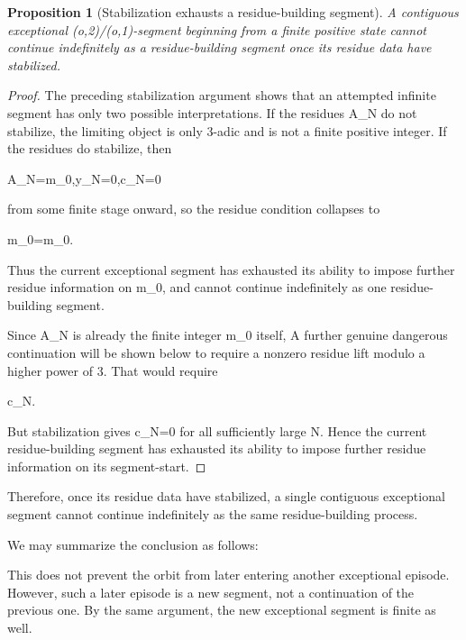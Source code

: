 \documentclass[11pt,letterpaper]{amsart}
\def\({}%
\def\){}%
\def\[{ }%
\def\]{ }%
\theoremstyle{definition}
\theoremstyle{plain}
\newtheorem{proposition}{Proposition}
\theoremstyle{plain}
\theoremstyle{remark}
\begin{document}
\begin{proposition}[Stabilization exhausts a residue-building segment]
\label{prop:stabilization-exhausts-residue-building-segment}
A contiguous exceptional \((o,2)/(o,1)\)-segment beginning from a finite
positive state cannot continue indefinitely as a residue-building segment
once its residue data have stabilized.
\end{proposition}

\begin{proof}
The preceding stabilization argument shows that an attempted infinite
segment has only two possible interpretations.  If the residues \(A_N\)
do not stabilize, the limiting object is only \(3\)-adic and is not a
finite positive integer.  If the residues do stabilize, then
\[
A_N=m_0,\qquad y_N=0,\qquad c_N=0
\]
from some finite stage onward, so the residue condition collapses to
\[
m_0=m_0.
\]
Thus the current exceptional segment has exhausted its ability to impose
further residue information on \(m_0\), and cannot continue indefinitely
as one residue-building segment.

Since \(A_N\) is already the finite integer \(m_0\) itself, A further genuine dangerous continuation will be shown below to require
a nonzero residue lift modulo a higher power of \(3\).  That would require
\[
c_N.
\]
But stabilization gives \(c_N=0\) for all sufficiently large \(N\).  Hence
the current residue-building segment has exhausted its ability to impose
further residue information on its segment-start.

\end{proof}

Therefore, once its residue data have stabilized, a single contiguous
exceptional segment cannot continue indefinitely as the same
residue-building process.

We may summarize the conclusion as follows:
\begin{center}
\end{center}

This does not prevent the orbit from later entering another exceptional
episode.  However, such a later episode is a new segment, not a
continuation of the previous one.  By the same argument, the new
exceptional segment is finite as well.
\end{document}
